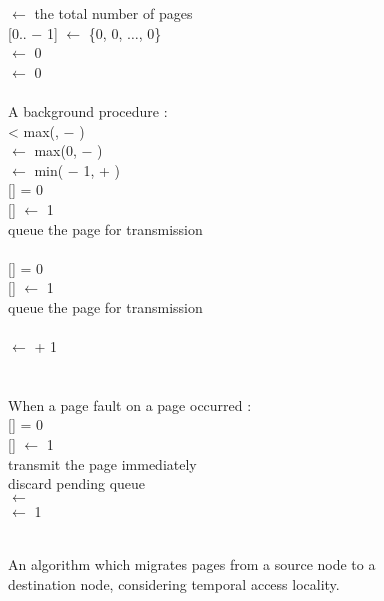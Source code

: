 \documentclass[10pt]{jsarticle}
\begin{document}
\begin{figure}
  \setlength{\baselineskip}{10pt}
  $\gets$ the total number of pages\\
 [0.. $-$ 1] $\gets$ \{0, 0, $\ldots$, 0\}\\
  $\gets$ 0\\
  $\gets$ 0\\
\zt \\
A background procedure :\\
\zt {}  < max(,  $-$ ) \\
\zt\zt {} $\gets$ max(0,  $-$ )\\
\zt\zt {} $\gets$ min( $-$ 1,  + )\\
\zt\zt {} [] = 0 \\
\zt\zt\zt {}[] $\gets$ 1\\
\zt\zt\zt queue the page  for transmission\\
\zt\zt {}\\
\zt\zt {} [] = 0 \\
\zt\zt\zt {}[] $\gets$ 1\\
\zt\zt\zt queue the page  for transmission\\
\zt\zt {}\\
\zt\zt {} $\gets$  + 1\\
\zt {}\\
\zt \\
When a page fault on a page  occurred :\\
\zt {} [] = 0 \\
\zt\zt {}[] $\gets$ 1\\
\zt\zt transmit the page  immediately\\
\zt\zt discard pending queue\\
\zt\zt {} $\gets$ \\
\zt\zt {} $\gets$ 1\\
\zt {}\\
\caption{An algorithm which migrates pages from a source node to a destination node, considering temporal access locality.}
\label{fig:pivot}
\end{figure}
\end{document}

